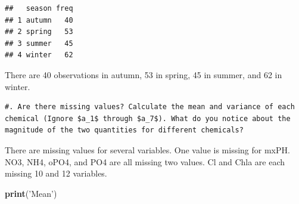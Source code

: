\documentclass[]{article}
\newenvironment{Shaded}{\begin{snugshade}}{\end{snugshade}}
\newcommand{\KeywordTok}[1]{\textcolor[rgb]{0.13,0.29,0.53}{\textbf{#1}}}
\newcommand{\StringTok}[1]{\textcolor[rgb]{0.31,0.60,0.02}{#1}}
\newcommand{\ControlFlowTok}[1]{\textcolor[rgb]{0.13,0.29,0.53}{\textbf{#1}}}
\newcommand{\OperatorTok}[1]{\textcolor[rgb]{0.81,0.36,0.00}{\textbf{#1}}}
\newcommand{\NormalTok}[1]{#1}
\begin{document}
\begin{Shaded}
\end{Shaded}

\begin{verbatim}
##   season freq
## 1 autumn   40
## 2 spring   53
## 3 summer   45
## 4 winter   62
\end{verbatim}

There are 40 observations in autumn, 53 in spring, 45 in summer, and 62
in winter.

\begin{verbatim}
#. Are there missing values? Calculate the mean and variance of each
chemical (Ignore $a_1$ through $a_7$). What do you notice about the
magnitude of the two quantities for different chemicals? 
\end{verbatim}

\begin{Shaded}
\end{Shaded}

There are missing values for several variables. One value is missing for
mxPH. NO3, NH4, oPO4, and PO4 are all missing two values. Cl and Chla
are each missing 10 and 12 variables.

\begin{Shaded}
\begin{Highlighting}[]
\KeywordTok{print}\NormalTok{(}\StringTok{'Mean'}\NormalTok{)}
\end{Highlighting}
\end{Shaded}
\end{document}
